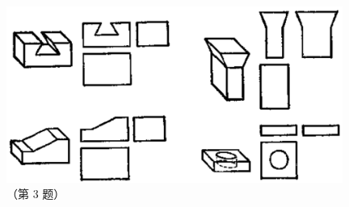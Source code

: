 \begin{xiaotis}

\begin{figure}[htbp]
    \centering
    \includegraphics[width=11cm]{../pic/czjh2-ch8-xiti30-03.png}
    \caption*{（第 3 题）}
\end{figure}

\end{xiaotis}

